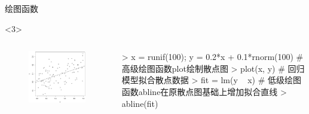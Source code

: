 \documentclass{beamerthemeMono}
\begin{document}
\begin{frame}[t,fragile]{\subsecname}{绘图函数}
\begin{overlayarea}{\textwidth}{\textheight}
\begin{onlyenv}<3>
\begin{columns}
        \begin{column}{.4\textwidth}
          \begin{figure}
            \centering
            \includegraphics[width=\columnwidth]{低级绘图函数.png}
          \end{figure}
        \end{column}

        \begin{column}{.6\textwidth}
 \centering
\begin{rcode}
> x = runif(100); y = 0.2*x + 0.1*rnorm(100)
# 高级绘图函数plot绘制散点图
> plot(x, y)
# 回归模型拟合散点数据
> fit = lm(y ~ x)
# 低级绘图函数abline在原散点图基础上增加拟合直线
> abline(fit)
\end{rcode}
        \end{column}
      \end{columns}
\end{onlyenv}
\end{overlayarea}  
\end{frame}
\end{document}
